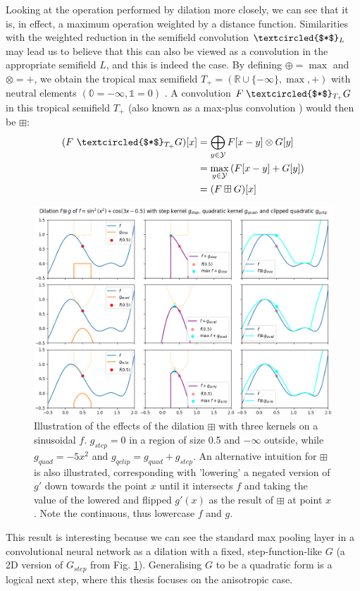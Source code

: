 \documentclass[a4paper, 12pt]{report}
\begin{document}
Looking at the operation performed by dilation more closely, we can see that it is, in effect, a maximum operation weighted by a distance function. Similarities with the weighted reduction in the semifield convolution $\textcircled{$*$}_L$ may lead us to believe that this can also be viewed as a convolution in the appropriate semifield $L$, and this is indeed the case. By defining $\oplus=\max$ and $\otimes=+$, we obtain the tropical max semifield $T_+=(\mathbb{R}\cup\{-\infty\},\max,+)$ with neutral elements $(\mathbb{0}=-\infty, \mathbb{1}=0)$ \cite{maragos, bellaardaxiomatic}. A convolution $F \;\textcircled{$*$}_{T_+} G$ in this tropical semifield $T_+$ (also known as a max-plus convolution \cite{maragos}) would then be $\boxplus$:
\begin{align*}
	(F ~\textcircled{$*$}_{T_+} G)[x]
	&= \bigoplus_{y\in \mathcal{Y}}F[x-y] \otimes G[y] \\
	&= \max_{y\in \mathcal{Y}}\left(F[x-y] + G[y]\right) \\
	&= (F \boxplus G)[x]
\end{align*}

\begin{figure}[h!]
  \includegraphics[width=\textwidth]{figures/dilation_illustration.png}
  \caption{Illustration of the effects of the dilation $\boxplus$ with three kernels on a sinusoidal $f$. $g_{step}=0$ in a region of size 0.5 and $-\infty$ outside, while $g_{quad}=-5x^2$ and $g_{qclip}=g_{quad}+g_{step}$. An alternative intuition for $\boxplus$ is also illustrated, corresponding with 'lowering' a negated version of $g'$ down towards the point $x$ until it intersects $f$ and taking the value of the lowered and flipped $g'(x)$ as the result of $\boxplus$ at point $x$. Note the continuous, thus lowercase $f$ and $g$.}
  \label{fig:dil-illust}
\end{figure}
\noindent
This result is interesting because we can see the standard max pooling layer in a convolutional neural network as a dilation with a fixed, step-function-like $G$ (a 2D version of $G_{step}$ from Fig. \ref{fig:dil-illust}). Generalising $G$ to be a quadratic form is a logical next step, where this thesis focuses on the anisotropic case.
\end{document}
